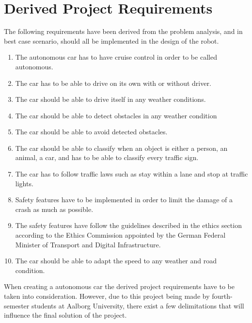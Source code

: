 \section{Derived Project Requirements}
The following requirements have been derived from the problem analysis, and in best case scenario, should all be implemented in the design of the robot.
\begin{enumerate}

\item The autonomous car has to have cruise control in order to be called autonomous.

\item The car has to be able to drive on its own with or without driver.

\item The car should be able to drive itself in any weather conditions.

\item The car should be able to detect obstacles in any weather condition

\item The car should be able to avoid detected obstacles.

\item The car should be able to classify when an object is either a person, an animal, a car, and has to be able to classify every traffic sign.

\item The car has to follow traffic laws such as stay within a lane and stop at traffic lights.

\item Safety features have to be implemented in order to limit the damage of a crash as much as possible.

\item The safety features have follow the guidelines described in the ethics section according to the Ethics Commission appointed by the German Federal Minister of Transport and Digital Infrastructure. 

\item The car should be able to adapt the speed to any weather and road condition.


\end{enumerate}

When creating a autonomous car the derived project requirements have to be taken into consideration. However, due to this project being made by fourth-semester students at Aalborg University, there exist a few delimitations that will influence the final solution of the project.

